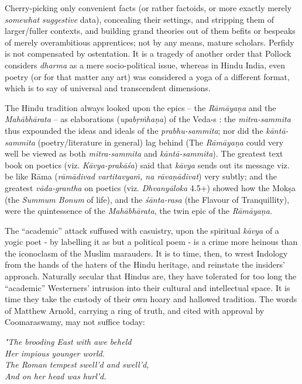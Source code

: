 Cherry-picking only convenient facts (or rather factoids, or more exactly merely {\sl somewhat suggestive} data), concealing their settings, and stripping them of larger/fuller contexts, and building grand theories out of them befits or bespeaks of merely overambitious apprentices; not by any means, mature scholars. Perfidy is not compensated by ostentation. It is a tragedy of another order that Pollock considers {\sl dharma} as a mere socio-political issue, whereas in Hindu India, even poetry (or for that matter any art) was considered a yoga of a different format, which is to say of universal and transcendent dimensions. 

The Hindu tradition always looked upon the epics -- the {\sl Rāmāyaṇa} and the {\sl Mahābhārata} -- as elaborations ({\sl upabṛṁhaṇa}) of the Veda-s : the {\sl mitra-sammita} thus expounded the ideas and ideals  of the {\sl prabhu-sammita}; nor did the {\sl kāntā-sammita} (poetry/literature in general) lag behind (The {\sl Rāmāyaṇa} could very well be viewed as both {\sl mitra-sammita} and {\sl kāntā-sammita}). The greatest text book on poetics (viz. {\sl Kāvya-prakāśa}) said that {\sl kāvya} sends out its message viz. be like Rāma ({\sl rāmādivad vartitavyaṁ, na rāvaṇādivat}) very subtly; and the greatest {\sl vāda-grantha} on poetics (viz. {\sl Dhvanyāloka} 4.5+) showed how the Mokṣa (the {\sl Summum Bonum} of life), and the {\sl śānta-rasa}  (the Flavour of Tranquillity), were the quintessence of the {\sl Mahābhārata}, the twin epic of the {\sl Rāmāyaṇa}.
 
The “academic” attack suffused with casuistry, upon the spiritual {\sl kāvya} of a yogic poet - by labelling it as but a political poem - is a crime more heinous than the iconoclasm of the Muslim marauders. It is to time, then, to wrest Indology from the hands of the haters of the Hindu heritage, and reinstate the insiders’ approach. Naturally secular that Hindus are, they have  tolerated for too long the “academic” Westerners’ intrusion into their cultural and intellectual space. It is time they take the custody of their own hoary and hallowed tradition. The words of Matthew Arnold, carrying a ring of truth, and cited with approval by Coomaraswamy, may not suffice today:

\begin{myquote}
{{\sl "The brooding East with awe beheld}}\\
{\sl Her impious younger world.}\\
{\sl The Roman tempest swell'd and swell'd,}\\
{\sl And on her head was hurl'd.}
\end{myquote}


